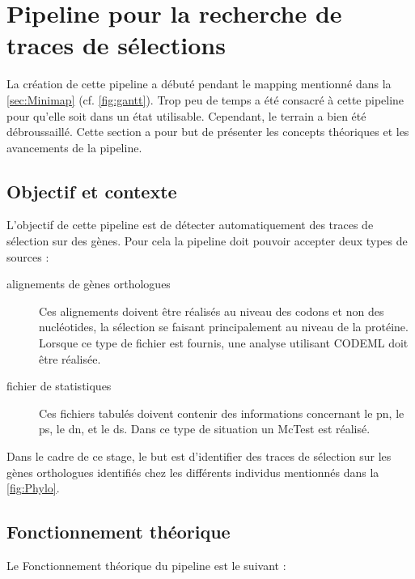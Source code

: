 \documentclass[../main]{subfiles} %
\begin{document}
\addto\extrasfrench{\protected\edef:{\unexpanded\expandafter{:}}}

\section{Pipeline pour la recherche de traces de sélections}
\label{sec:PipelineTrace}
La création de cette pipeline a débuté pendant le \gls{mapping} mentionné dans la \cref{sec:Minimap} (cf. \cref{fig:gantt}). Trop peu de temps a été consacré à cette pipeline pour qu'elle soit dans un état utilisable. Cependant, le terrain a bien été débroussaillé. Cette section a pour but de présenter les concepts théoriques et les avancements de la pipeline.

\subsection{Objectif et contexte}
L'objectif de cette pipeline est de détecter automatiquement des traces de sélection sur des gènes. Pour cela la pipeline doit pouvoir accepter deux types de sources :

\begin{description}
    \item[alignements de gènes \glspl{orthologue}] Ces alignements doivent être réalisés au niveau des \glspl{codon} et non des \glspl{nucléotide}, la sélection se faisant principalement au niveau de la protéine. Lorsque ce type de fichier est fournis, une analyse utilisant \gls{CODEML} doit être réalisée.
    
    \item[fichier de statistiques] Ces fichiers tabulés doivent contenir des informations concernant le \acrshort{pn}, le \acrshort{ps}, le \acrshort{dn}, et le \acrshort{ds}. Dans ce type de situation un \gls{McTest} est réalisé.
\end{description}

Dans le cadre de ce stage, le but est d'identifier des traces de sélection sur les gènes \glspl{orthologue} identifiés chez les différents individus mentionnés dans la \cref{fig:Phylo}.

\subsection{Fonctionnement théorique}
\label{sec:PipelineFoncionnement}
Le Fonctionnement théorique du pipeline est le suivant :
\end{document}
